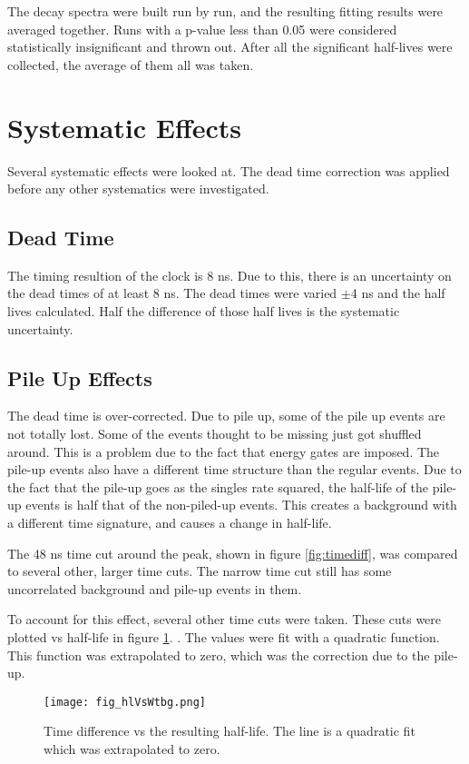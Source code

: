 \documentclass[MaxHughesThesis.tex]{subfiles}
\begin{document}
The decay spectra were built run by run, and the resulting fitting results were averaged together. 
Runs with a p-value less than 0.05 were considered statistically insignificant and thrown out.
After all the significant half-lives were collected, the average of them all was taken.

\section{Systematic Effects}
Several systematic effects were looked at.
The dead time correction was applied before any other systematics were investigated. 

\subsection{Dead Time}
The timing resultion of the clock is 8 ns.
Due to this, there is an uncertainty on the dead times of at least 8 ns.
The dead times were varied $\pm$4 ns and the half lives calculated.
Half the difference of those half lives is the systematic uncertainty.

\subsection{Pile Up Effects}
The dead time is over-corrected. 
Due to pile up, some of the pile up events are not totally lost.
Some of the events thought to be missing just got shuffled around.
This is a problem due to the fact that energy gates are imposed.
The pile-up events also have a different time structure than the regular events.
Due to the fact that the pile-up goes as the singles rate squared, the half-life of the pile-up events is half that of the non-piled-up events.
This creates a background with a different time signature, and causes a change in half-life.

The 48 ns time cut around the peak, shown in figure \ref{fig:timediff}, was compared to several other, larger time cuts.
The narrow time cut still has some uncorrelated background and pile-up events in them.


To account for this effect, several other time cuts were taken.
These cuts were plotted vs half-life in figure \ref{fig:timediffvhl}. .
The values were fit with a quadratic function.
This function was extrapolated to zero, which was the correction due to the pile-up.
 

\begin{figure}[!htb]
\centerline{\texttt{[image: fig\_hlVsWtbg.png]}}
\caption{Time difference vs the resulting half-life.
	 The line is a quadratic fit which was extrapolated to zero.
	}
\label{fig:timediffvhl}
\end{figure}
 
\end{document}
